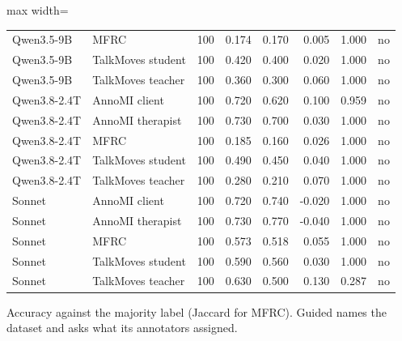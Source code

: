\begin{table}[t]
\begin{adjustbox}{max width=\linewidth}
\begin{tabular}{llrrrrrr}
Qwen3.5-9B & MFRC & 100 & 0.174 & 0.170 & 0.005 & 1.000 & no \\
Qwen3.5-9B & TalkMoves student & 100 & 0.420 & 0.400 & 0.020 & 1.000 & no \\
Qwen3.5-9B & TalkMoves teacher & 100 & 0.360 & 0.300 & 0.060 & 1.000 & no \\
Qwen3.8-2.4T & AnnoMI client & 100 & 0.720 & 0.620 & 0.100 & 0.959 & no \\
Qwen3.8-2.4T & AnnoMI therapist & 100 & 0.730 & 0.700 & 0.030 & 1.000 & no \\
Qwen3.8-2.4T & MFRC & 100 & 0.185 & 0.160 & 0.026 & 1.000 & no \\
Qwen3.8-2.4T & TalkMoves student & 100 & 0.490 & 0.450 & 0.040 & 1.000 & no \\
Qwen3.8-2.4T & TalkMoves teacher & 100 & 0.280 & 0.210 & 0.070 & 1.000 & no \\
Sonnet & AnnoMI client & 100 & 0.720 & 0.740 & -0.020 & 1.000 & no \\
Sonnet & AnnoMI therapist & 100 & 0.730 & 0.770 & -0.040 & 1.000 & no \\
Sonnet & MFRC & 100 & 0.573 & 0.518 & 0.055 & 1.000 & no \\
Sonnet & TalkMoves student & 100 & 0.590 & 0.560 & 0.030 & 1.000 & no \\
Sonnet & TalkMoves teacher & 100 & 0.630 & 0.500 & 0.130 & 0.287 & no \\
\bottomrule
\end{tabular}
\end{adjustbox}
\par\smallskip\footnotesize\raggedright Accuracy against the majority label (Jaccard for MFRC). Guided names the dataset and asks what its annotators assigned.
\end{table}
